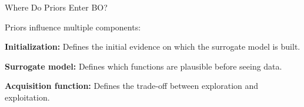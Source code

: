 \documentclass[main]{subfiles}
\begin{document}
\begin{frame}{Where Do Priors Enter BO?}

Priors influence multiple components:

\vspace{0.3cm}

\textbf{Initialization:} Defines the initial evidence on which the surrogate model is built.
\vspace{0.3cm}

\textbf{Surrogate model:} Defines which functions are plausible before seeing data.
\vspace{0.3cm}

\textbf{Acquisition function:} Defines the trade-off between exploration and exploitation.

\end{frame}
\end{document}

